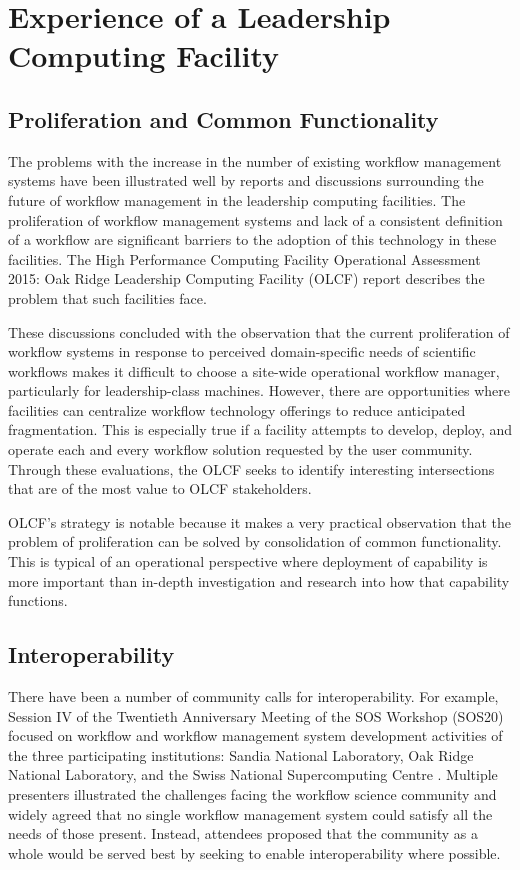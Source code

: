 \section{Experience of a Leadership Computing Facility}\label{olcf}

\subsection{Proliferation and Common Functionality} \label{commonFunc}

The problems with the increase in the number of existing workflow management
systems have been illustrated well by reports and discussions surrounding the
future of workflow management in the leadership computing facilities. The
proliferation of workflow management systems and lack of a consistent
definition of a workflow are significant barriers to the adoption of this
technology in these facilities. The High Performance Computing Facility
Operational Assessment 2015: Oak Ridge Leadership Computing Facility (OLCF)
report \cite{barker_scientific_2007} describes the problem that such
facilities face.  \begin{displayquote} These discussions concluded with the
observation that the current proliferation of workflow systems in response to
perceived domain-specific needs of scientific workflows makes it difficult to
choose a site-wide operational workflow manager, particularly for
leadership-class machines. However, there are opportunities where facilities
can centralize workflow technology offerings to reduce anticipated
fragmentation. This is especially true if a facility attempts to develop,
deploy, and operate each and every workflow solution requested by the user
community. Through these evaluations, the OLCF seeks to identify interesting
intersections that are of the most value to OLCF stakeholders.
\end{displayquote}  OLCF's strategy is notable because it makes a
very practical observation that the problem of proliferation can be solved by
consolidation of common functionality. This is typical of an operational
perspective where deployment of capability is more important than in-depth
investigation and research into how that capability functions.

\subsection{Interoperability}\label{interop}

There have been a number of community calls for interoperability. For example,
Session IV of the Twentieth Anniversary Meeting of the SOS Workshop (SOS20)
focused on workflow and workflow management system development activities of
the three participating institutions: Sandia National Laboratory, Oak Ridge
National Laboratory, and the Swiss National Supercomputing Centre
\cite{pack_sos20_2016}. Multiple presenters illustrated the challenges facing
the workflow science community and widely agreed that no single workflow
management system could satisfy all the needs of those present. Instead,
attendees proposed that the community as a whole would be served best by
seeking to enable interoperability where possible.

